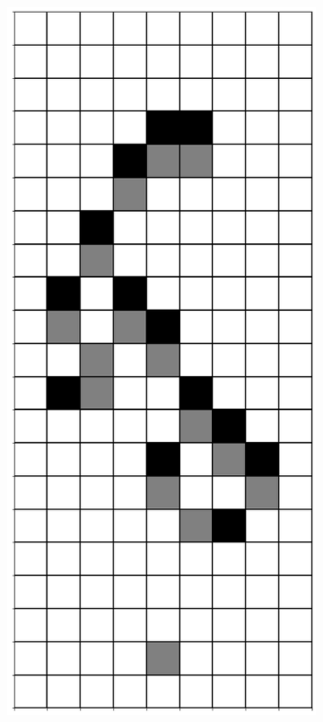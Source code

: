 \documentclass[12pt]{article}
\numberwithin{figure}{section} %
\begin{document}
\begin{figure}[H]
\begin{subfigure}{0.19\textwidth}
     		\subcaption{}
   	\end{subfigure}
        \begin{subfigure}{0.19\textwidth}
     		\centering
     		\includegraphics[width=\linewidth]{Section4/25.2}

\end{subfigure}
\end{figure}
\end{document}
